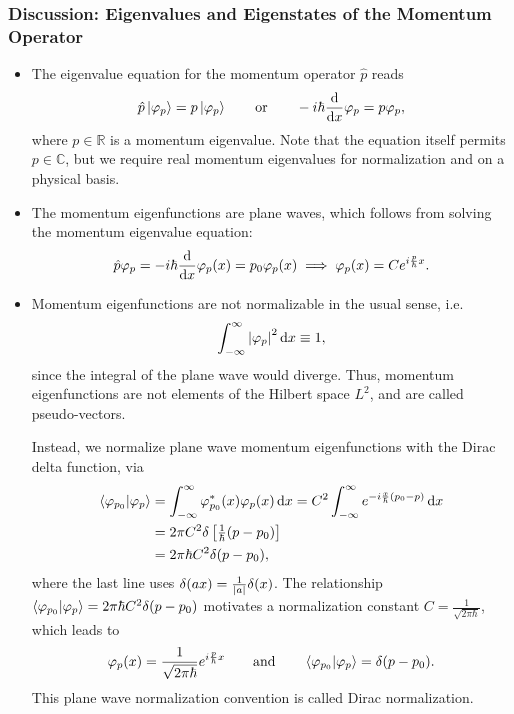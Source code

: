 \documentclass[11pt, a4paper]{article}
\newcommand{\diff}{\mathop{}\!\mathrm{d}} %
\begin{document}
\subsubsection{Discussion: Eigenvalues and Eigenstates of the Momentum Operator} \label{sss:momentum-eigenstates}
\begin{itemize}

    \item The eigenvalue equation for the momentum operator $ \hat{p} $ reads
    \begin{equation*}
        \hat{p} \ket{\varphi_{p}} = p \ket{\varphi_{p}} \qquad \text{or} \qquad -i \hbar \dv{x} \varphi_{p} = p \varphi_{p},
    \end{equation*}
    where $ p \in \mathbb{R} $ is a momentum eigenvalue. Note that the equation itself permits $ p \in \mathbb{C} $, but we require real momentum eigenvalues for normalization and on a physical basis. 

    \item The momentum eigenfunctions are plane waves, which follows from solving the momentum eigenvalue equation:
    \begin{equation*}
        \hat{p}\varphi_{p} = - i \hbar \dv{x} \varphi_{p}(x) = p_{0}\varphi_{p}(x) \implies \varphi_{p}(x) = C e^{i \frac{p}{\hbar}x}.
    \end{equation*}
    
    \item Momentum eigenfunctions are not normalizable in the usual sense, i.e.
    \begin{equation*}
       \int_{-\infty}^{\infty} \abs{\varphi_{p}}^{2}\diff x \equiv 1,
    \end{equation*}
    since the integral of the plane wave would diverge. Thus, momentum eigenfunctions are not elements of the Hilbert space $ L^{2} $, and are called pseudo-vectors.

    Instead, we normalize plane wave momentum eigenfunctions with the Dirac delta function, via
    \begin{align*}
        \braket{\varphi_{p_{0}}}{\varphi_{p}} & =  \int_{-\infty}^{\infty}\varphi^{*}_{p_{0}}(x) \varphi_{p}(x) \diff x = C^{2} \int_{-\infty}^{\infty} e^{-i \frac{x}{\hbar}(p_{0} - p)}\diff x\\
        & = 2\pi C^{2} \delta \left[ \tfrac{1}{\hbar} (p - p_{0}) \right] \\
        & = 2 \pi \hbar C^{2} \delta(p - p_{0}),
    \end{align*}
    where the last line uses $ \delta(ax) = \frac{1}{\abs{a}} \delta(x) $. The relationship $ \braket{\varphi_{p_{0}}}{\varphi_{p}} = 2 \pi \hbar C^{2} \delta(p - p_{0}) $ motivates a normalization constant $ C = \frac{1}{\sqrt{2\pi \hbar}} $, which leads to
    \begin{equation*}
        \varphi_{p}(x) = \frac{1}{\sqrt{2\pi \hbar}} e^{i \frac{p}{\hbar}x} \qquad \text{and} \qquad \braket{\varphi_{p_{0}}}{\varphi_{p}} = \delta(p - p_{0}).
    \end{equation*}
    This plane wave normalization convention is called Dirac normalization.
    

\end{itemize}
\end{document}

